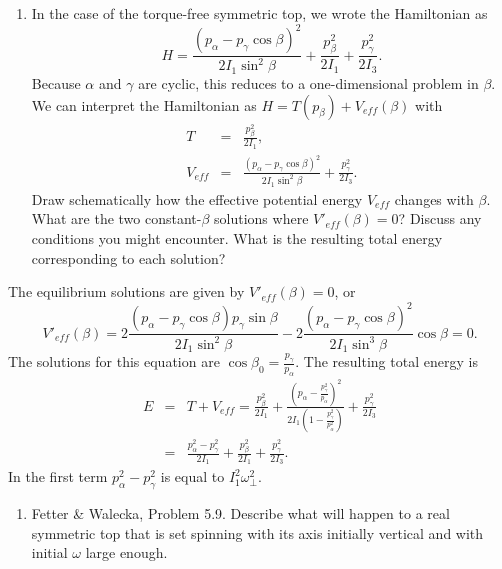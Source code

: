 \documentclass[letterpaper,11pt]{article}
\begin{document}
 
\begin{enumerate}[resume]
 \item In the case of the torque-free symmetric top, we wrote the Hamiltonian as
 \begin{equation*}
  H = \frac{(p_\alpha - p_\gamma\cos\beta)^2}{2 I_1 \sin^2\beta} + \frac{p^2_\beta}{2 I_1} + \frac{p^2_\gamma}{2 I_3}.
 \end{equation*}
 Because $\alpha$ and $\gamma$ are cyclic, this reduces to a one-dimensional problem in $\beta$.  We can interpret the Hamiltonian as $H = T(p_\beta) + V_{eff}(\beta)$ with
 \begin{eqnarray*}
  T & = & \frac{p^2_\beta}{2 I_1}, \\
  V_{eff} & = & \frac{(p_\alpha - p_\gamma\cos\beta)^2}{2 I_1 \sin^2\beta} + \frac{p^2_\gamma}{2 I_3}.
 \end{eqnarray*}
 Draw schematically how the effective potential energy $V_{eff}$ changes with $\beta$.  What are the two constant-$\beta$ solutions where $V'_{eff}(\beta) = 0$?  Discuss any conditions you might encounter.  What is the resulting total energy corresponding to each solution?
\end{enumerate}

The equilibrium solutions are given by $V'_{eff}(\beta) = 0$, or
\begin{equation*}
 V'_{eff}(\beta) = 2 \frac{(p_\alpha - p_\gamma \cos\beta) p_\gamma \sin\beta}{2 I_1 \sin^2 \beta} - 2 \frac{(p_\alpha - p_\gamma \cos\beta)^2}{2 I_1 \sin^3 \beta} \cos\beta = 0.
\end{equation*}
The solutions for this equation are $\cos\beta_0 = \frac{p_\gamma}{p_\alpha}$.  The resulting total energy is
\begin{eqnarray*}
 E & = & T + V_{eff} = \frac{p_\beta^2}{2 I_1} + \frac{\left(p_\alpha - \frac{p_\gamma^2}{p_\alpha}\right)^2}{2 I_1 \left(1 - \frac{p_\gamma^2}{p_\alpha^2}\right)} + \frac{p_\gamma^2}{2 I_3} \\
 & = & \frac{p_\alpha^2 - p_\gamma^2}{2 I_1} + \frac{p_\beta^2}{2 I_1} + \frac{p_\gamma^2}{2 I_3}.
\end{eqnarray*}
In the first term $p_\alpha^2 - p_\gamma^2$ is equal to $I_1^2 \omega_\perp^2$.

 
\begin{enumerate}[resume]
 \item Fetter \& Walecka, Problem 5.9.  Describe what will happen to a real symmetric top that is set spinning with its axis initially vertical and with initial $\omega$ large enough.
\end{enumerate}
\end{document}

